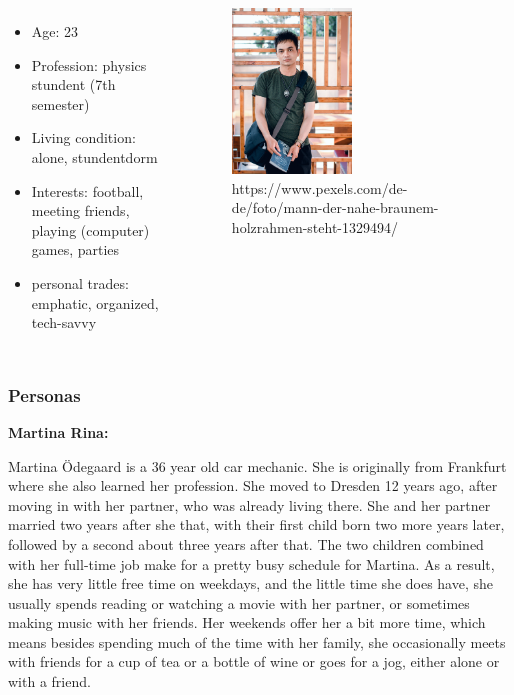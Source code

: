 \documentclass[aspectratio=169]{beamer}
\begin{document}
\begin{columns}
		\begin{itemize}
		\item Age: 23
		\item Profession: physics stundent (7th semester)
		\item Living condition: alone, stundentdorm
		\item Interests: football, meeting friends, playing (computer) games, parties
		\item personal trades: emphatic, organized, tech-savvy
	\end{itemize}
	 \begin{figure}
		 \centering
		\includegraphics[width=0.5\textwidth]{media/student.jpg}
		\caption{https://www.pexels.com/de-de/foto/mann-der-nahe-braunem-holzrahmen-steht-1329494/}
	\end{figure}
\end{columns}





\begin{frame}   
	\frametitle{Personas}{\textbf{Martina Rina:}}

	Martina Ödegaard is a 36 year old car mechanic. She is originally from Frankfurt where she also learned her profession. She moved to Dresden 12 years ago, after moving in with her partner, who was already living there. She and her partner married 	two years after she that, with their first child born two more years later, followed by a second about three years after that. The two children combined with her full-time job make for a pretty busy schedule for Martina. As a result, she has very little free time on weekdays, and the little time she does have, she usually spends reading or watching a movie with her partner, or sometimes making music with her friends. Her weekends offer her a bit more time, which means besides spending much of the time with her family, she occasionally meets with friends for a cup of tea or a bottle of wine or goes for a jog, either alone or with a friend. 

\end{frame}
\end{document}
